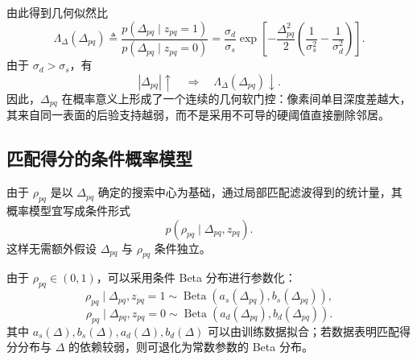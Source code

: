\documentclass[11pt,a4paper]{ctexart}
\numberwithin{equation}{section}
\newcommand{\BetaDist}{\operatorname{Beta}}
\begin{document}
由此得到几何似然比
\begin{equation}
    \boxed{
    \Lambda_{\Delta}(\Delta_{pq})
    \triangleq
    \frac{p(\Delta_{pq}\mid z_{pq}=1)}
    {p(\Delta_{pq}\mid z_{pq}=0)}
    =
    \frac{\sigma_d}{\sigma_s}
    \exp\!\left[
    -\frac{\Delta_{pq}^{2}}{2}
    \left(
    \frac{1}{\sigma_s^2}
    -
    \frac{1}{\sigma_d^2}
    \right)
    \right]
    }.
    \label{eq:geometry_bayes_factor}
\end{equation}
由于 $\sigma_d>\sigma_s$，有
\begin{equation}
    |\Delta_{pq}|\uparrow
    \quad\Longrightarrow\quad
    \Lambda_{\Delta}(\Delta_{pq})\downarrow.
    \label{eq:soft_gate_monotonic}
\end{equation}
因此，$\Delta_{pq}$ 在概率意义上形成了一个连续的几何软门控：像素间单目深度差越大，其来自同一表面的后验支持越弱，而不是采用不可导的硬阈值直接删除邻居。

\subsection{匹配得分的条件概率模型}

由于 $\rho_{pq}$ 是以 $\Delta_{pq}$ 确定的搜索中心为基础，通过局部匹配滤波得到的统计量，其概率模型宜写成条件形式
\begin{equation}
    p(\rho_{pq}\mid\Delta_{pq},z_{pq}).
    \label{eq:rho_conditional_model}
\end{equation}
这样无需额外假设 $\Delta_{pq}$ 与 $\rho_{pq}$ 条件独立。

由于 $\rho_{pq}\in(0,1)$，可以采用条件 Beta 分布进行参数化：
\begin{equation}
    \rho_{pq}\mid\Delta_{pq},z_{pq}=1
    \sim
    \BetaDist\!\left(
    a_s(\Delta_{pq}),b_s(\Delta_{pq})
    \right),
    \label{eq:rho_same}
\end{equation}
\begin{equation}
    \rho_{pq}\mid\Delta_{pq},z_{pq}=0
    \sim
    \BetaDist\!\left(
    a_d(\Delta_{pq}),b_d(\Delta_{pq})
    \right).
    \label{eq:rho_diff}
\end{equation}
其中 $a_s(\Delta),b_s(\Delta),a_d(\Delta),b_d(\Delta)$ 可以由训练数据拟合；若数据表明匹配得分分布与 $\Delta$ 的依赖较弱，则可退化为常数参数的 Beta 分布。
\end{document}

